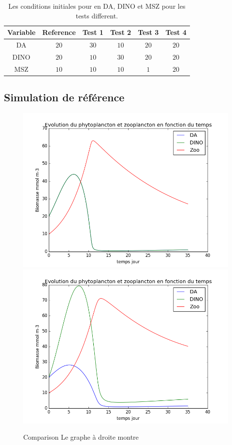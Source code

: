 \par{

}

\begin{table}[h!]
\begin{center}
\begin{tabular}{ | c | c | c | c | c | c | }
\hline
Variable & Reference & Test 1 & Test 2 & Test 3 & Test 4 \\
\hline
DA & $20$ & $30$ & $10$ & $20$ & $20$ \\
DINO & $20$ & $10$ & $30$ & $20$ & $20$ \\
MSZ & $10$ & $10$ & $10$ & $1$ & $20$ \\
\hline
\end{tabular}
\end{center}
  \caption{Les conditions initiales pour en DA, DINO et MSZ pour les tests different.}
  \label{tab:partie2params}
\end{table}

\subsection{Simulation de référence}

\begin{figure}
  \includegraphics[width=.5\textwidth]{partie2/1Nonselec.png}\hfill
  \includegraphics[width=.5\textwidth]{partie2/1Selec.png}
  \caption{Comparison 
Le graphe à droite montre \todo}
  \label{fig:partie2Ref}
\end{figure}

